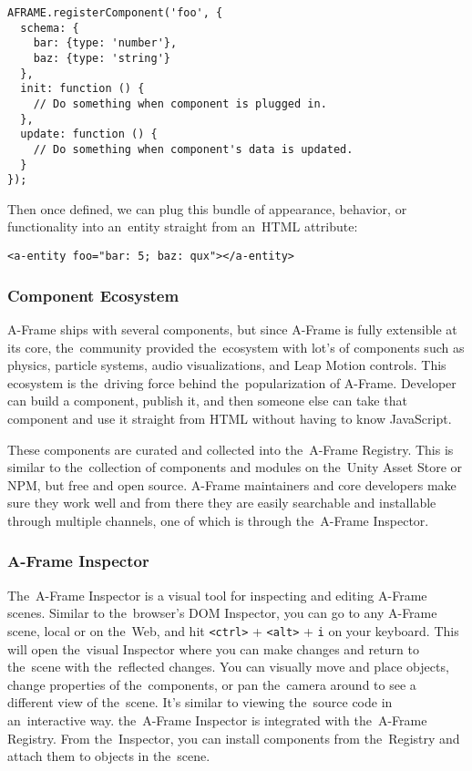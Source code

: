 \begin{lstlisting}
AFRAME.registerComponent('foo', {
  schema: {
    bar: {type: 'number'},
    baz: {type: 'string'}
  },
  init: function () {
    // Do something when component is plugged in.
  },
  update: function () {
    // Do something when component's data is updated.
  }
});
\end{lstlisting}

\newpage
Then once defined, we can plug this bundle of appearance, behavior, or functionality into an~entity straight from an~HTML attribute:

\begin{lstlisting}
<a-entity foo="bar: 5; baz: qux"></a-entity>
\end{lstlisting}

\subsubsection{Component Ecosystem}
A-Frame ships with several components, but since A-Frame is fully extensible at its core, the~community provided the~ecosystem with lot's of components such as physics, particle systems, audio visualizations, and Leap Motion controls. This ecosystem is the~driving force behind the~popularization of A-Frame. Developer can build a component, publish it, and then someone else can take that component and use it straight from HTML without having to know JavaScript. \cite{aframe-intro}

These components are curated and collected into the~A-Frame Registry. This is similar to the~collection of components and modules on the~Unity Asset Store or NPM, but free and open source. A-Frame maintainers and core developers make sure they work well and from there they are easily searchable and installable through multiple channels, one of which is through the~A-Frame Inspector. \cite{aframe-intro}

\subsubsection{A-Frame Inspector}
The~A-Frame Inspector is a visual tool for inspecting and editing A-Frame scenes. Similar to the~browser’s DOM Inspector, you can go to any A-Frame scene, local or on the~Web, and hit \texttt{<ctrl>} + \texttt{<alt>} + \texttt{i} on your keyboard. This will open the~visual Inspector where you can make changes and return to the~scene with the~reflected changes. You can visually move and place objects, change properties of the~components, or pan the~camera around to see a different view of the~scene. It’s similar to viewing the~source code in an~interactive way. the~A-Frame Inspector is integrated with the~A-Frame Registry. From the~Inspector, you can install components from the~Registry and attach them to objects in the~scene. \cite{aframe-intro}


